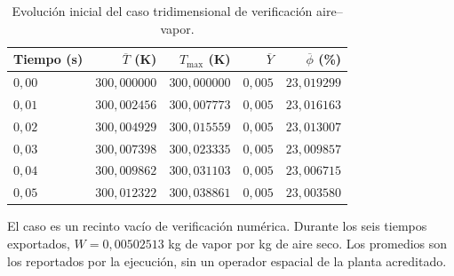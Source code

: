 \begin{table}[htbp]
\centering
\caption{Evolución inicial del caso tridimensional de verificación aire--vapor.}
\label{tab:res_cfd}
\small
\setlength{\tabcolsep}{5pt}
\begin{tabular}{lrrrr}
\toprule
Tiempo (s) & $\overline T$ (K) & $T_{\max}$ (K) & $\overline Y$ & $\overline\phi$ (\%) \\
\midrule
$0{,}00$ & $300{,}000000$ & $300{,}000000$ & $0{,}005$ & $23{,}019299$ \\
$0{,}01$ & $300{,}002456$ & $300{,}007773$ & $0{,}005$ & $23{,}016163$ \\
$0{,}02$ & $300{,}004929$ & $300{,}015559$ & $0{,}005$ & $23{,}013007$ \\
$0{,}03$ & $300{,}007398$ & $300{,}023335$ & $0{,}005$ & $23{,}009857$ \\
$0{,}04$ & $300{,}009862$ & $300{,}031103$ & $0{,}005$ & $23{,}006715$ \\
$0{,}05$ & $300{,}012322$ & $300{,}038861$ & $0{,}005$ & $23{,}003580$ \\
\bottomrule
\end{tabular}
\par\vspace{3pt}
\begin{minipage}{0.98\textwidth}\footnotesize
El caso es un recinto vacío de verificación numérica. Durante los seis tiempos exportados, $W=0{,}00502513$ kg de vapor por kg de aire seco. Los promedios son los reportados por la ejecución, sin un operador espacial de la planta acreditado.
\end{minipage}
\end{table}
